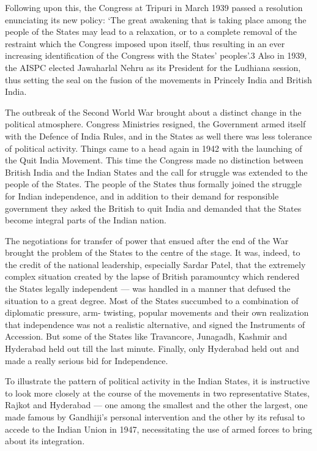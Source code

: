 \begin{multicols}{2}
Following upon this, the Congress at Tripuri in March 1939 passed a resolution enunciating its new policy: `The great awakening that is taking place among the people of the States may lead to a relaxation, or to a complete removal of the restraint which the Congress imposed upon itself, thus resulting in an ever increasing identification of the Congress with the States' peoples'.3 Also in 1939, the AISPC elected Jawaharlal Nehru as its President for the Ludhiana session, thus setting the seal on the fusion of the movements in Princely India and British India. 

The outbreak of the Second World War brought about a distinct change in the political atmosphere. Congress Ministries resigned, the Government armed itself with the Defence of India Rules, and in the States as well there was less tolerance of political activity. Things came to a head again in 1942 with the launching of the Quit India Movement. This time the Congress made no distinction between British India and the Indian States and the call for struggle was extended to the people of the States. The people of the States thus formally joined the struggle for Indian independence, and in addition to their demand for responsible government they asked the British to quit India and demanded that the States become integral parts of the Indian nation. 

The negotiations for transfer of power that ensued after the end of the War brought the problem of the States to the centre of the stage. It was, indeed, to the credit of the national leadership, especially Sardar Patel, that the extremely complex situation created by the lapse of British paramountcy which rendered the States legally independent --- was handled in a manner that defused the situation to a great degree. Most of the States succumbed to a combination of diplomatic pressure, arm- twisting, popular movements and their own realization that independence was not a realistic alternative, and signed the Instruments of Accession. But some of the States like Travancore, Junagadh, Kashmir and Hyderabad held out till the last minute. Finally, only Hyderabad held out and made a really serious bid for Independence. 

To illustrate the pattern of political activity in the Indian States, it is instructive to look more closely at the course of the movements in two representative States, Rajkot and Hyderabad --- one among the smallest and the other the largest, one made famous by Gandhiji's personal intervention and the other by its refusal to accede to the Indian Union in 1947, necessitating the use of armed forces to bring about its integration.


\end{multicols}
